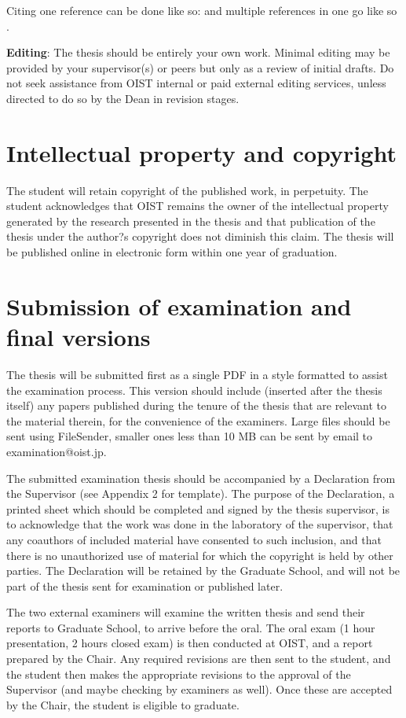 Citing one reference can be done like so: \cite{Lee98} and multiple references in one go like so \cite{Fil09, Muc10, Kra27}.

\textbf{Editing}:  The thesis should be entirely your own work. Minimal editing may be provided by your supervisor(s) or peers but only as a review of initial drafts.  Do not seek assistance from OIST internal or paid external editing services, unless directed to do so by the Dean in revision stages.

\section{Intellectual property and copyright}

The student will retain copyright of the published work, in perpetuity.  The student acknowledges that OIST remains the owner of the intellectual property generated by the research presented in the thesis and that publication of the thesis under the author?s copyright does not diminish this claim.  The thesis will be published online in electronic form within one year of graduation.

 \section{Submission of examination and final versions}

The thesis will be submitted first as a single PDF in a style formatted to assist the examination process. This version should include (inserted after the thesis itself) any papers published during the tenure of the thesis that are relevant to the material therein, for the convenience of the examiners.  Large files should be sent using FileSender, smaller ones less than 10 MB can be sent by email to examination@oist.jp.

The submitted examination thesis should be accompanied by a Declaration from the Supervisor (see Appendix 2 for template). The purpose of the Declaration, a printed sheet which should be completed and signed by the thesis supervisor, is to acknowledge that the work was done in the laboratory of the supervisor, that any coauthors of included material have consented to such inclusion, and that there is no unauthorized use of material for which the copyright is held by other parties. The Declaration will be retained by the Graduate School, and will not be part of the thesis sent for examination or published later.

The two external examiners will examine the written thesis and send their reports to Graduate School, to arrive before the oral.  The oral exam (1 hour presentation, 2 hours closed exam) is then conducted at OIST, and a report prepared by the Chair.  Any required revisions are then sent to the student, and the student then makes the appropriate revisions to the approval of the Supervisor (and maybe checking by examiners as well). Once these are accepted by the Chair, the student is eligible to graduate.

